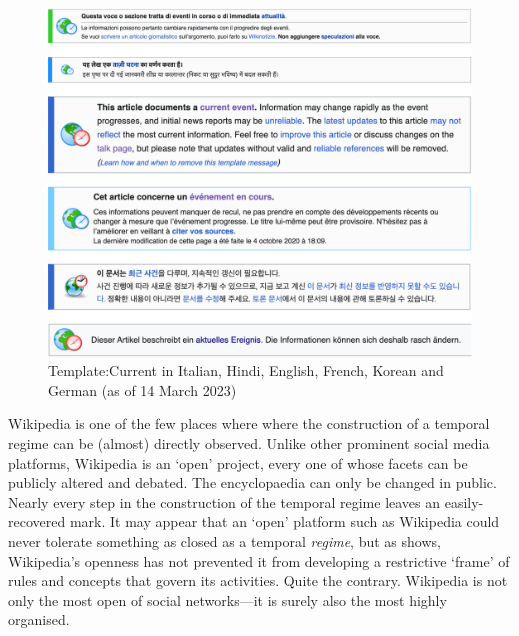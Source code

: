 \documentclass[Royal,times,sageh]{sagej}
\begin{document}
\begin{figure}
\includegraphics[width=1\linewidth]{images/banner_collage} \caption{Template:Current in Italian, Hindi, English, French, Korean and German (as of 14 March 2023)\label{fig:banner_collage}}\label{fig:unnamed-chunk-1}
\end{figure}

Wikipedia is one of the few places where where the construction of a
temporal regime can be (almost) directly observed. Unlike other
prominent social media platforms, Wikipedia is an `open' project, every
one of whose facets can be publicly altered and debated. The
encyclopaedia can only be changed in public. Nearly every step in the
construction of the temporal regime leaves an easily-recovered mark. It
may appear that an `open' platform such as Wikipedia could never
tolerate something as closed as a temporal \emph{regime}, but as
\citet{tkacz_wikipedia_2015} shows, Wikipedia's openness has not
prevented it from developing a restrictive `frame' of rules and concepts
that govern its activities. Quite the contrary. Wikipedia is not only
the most open of social networks---it is surely also the most highly
organised.
\end{document}
